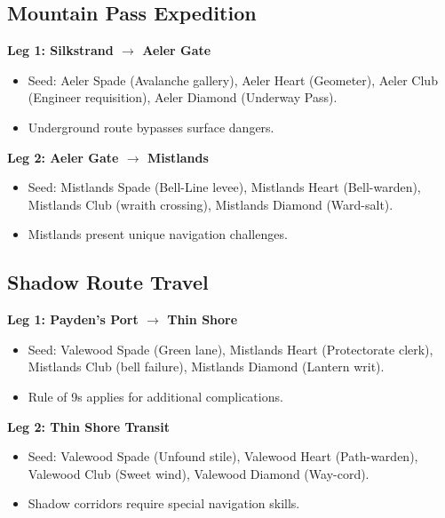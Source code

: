 \subsection{Mountain Pass Expedition}
\label{subsec:mountain-pass}

\textbf{Leg 1: Silkstrand $\rightarrow$ Aeler Gate}
\begin{itemize}
\item Seed: Aeler Spade (Avalanche gallery), Aeler Heart (Geometer), Aeler Club (Engineer requisition), Aeler Diamond (Underway Pass).
\item Underground route bypasses surface dangers.
\end{itemize}

\textbf{Leg 2: Aeler Gate $\rightarrow$ Mistlands}
\begin{itemize}
\item Seed: Mistlands Spade (Bell-Line levee), Mistlands Heart (Bell-warden), Mistlands Club (wraith crossing), Mistlands Diamond (Ward-salt).
\item Mistlands present unique navigation challenges.
\end{itemize}

\subsection{Shadow Route Travel}
\label{subsec:shadow-route}

\textbf{Leg 1: Payden's Port $\rightarrow$ Thin Shore}
\begin{itemize}
\item Seed: Valewood Spade (Green lane), Mistlands Heart (Protectorate clerk), Mistlands Club (bell failure), Mistlands Diamond (Lantern writ).
\item Rule of 9s applies for additional complications.
\end{itemize}

\textbf{Leg 2: Thin Shore Transit}
\begin{itemize}
\item Seed: Valewood Spade (Unfound stile), Valewood Heart (Path-warden), Valewood Club (Sweet wind), Valewood Diamond (Way-cord).
\item Shadow corridors require special navigation skills.
\end{itemize}

